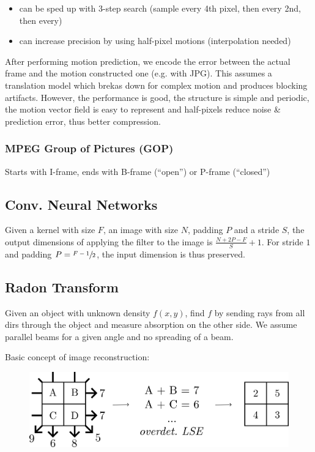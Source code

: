 \documentclass[a4paper,10pt]{article}
\begin{document}
\begin{itemize}
    \item can be sped up with 3-step search (sample every 4th pixel, then every 2nd, then every)
    \item can increase precision by using half-pixel motions (interpolation needed)
\end{itemize}
After performing motion prediction, we encode the error between the actual frame and the motion constructed one (e.g. with JPG).
This assumes a translation model which brekas down for complex motion and produces blocking artifacts. However, the performance is good, the structure is simple and periodic, the motion vector field is easy to represent and half-pixels reduce noise \& prediction error, thus better compression.
\subsubsection{MPEG Group of Pictures (GOP)} Starts with I-frame, ends with B-frame (``open'') or P-frame (``closed'')

\subsection{Conv. Neural Networks}
Given a kernel with size \( F \), an image with size \( N \), padding \( P \) and a stride \( S \), the output dimensions of applying the filter to the image is \( \frac{N+2P-F}{S} + 1 \). For stride \( 1 \) and padding \( P = \sfrac{F-1}{2} \), the input dimension is thus preserved.

\subsection{Radon Transform}
Given an object with unknown density \( f(x,y) \), find \( f \) by sending rays from all dirs through the object and measure absorption on the other side. We assume parallel beams for a given angle and no spreading of a beam.

Basic concept of image reconstruction:
\begin{figure}[h]
    \center
    \includegraphics[width=0.75\linewidth]{radon-image-reconstruction.png}
\end{figure}
\end{document}
